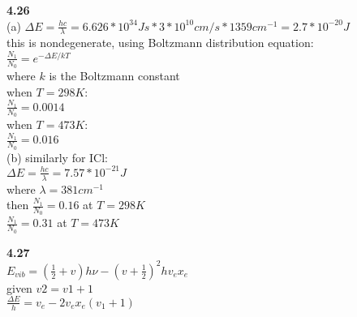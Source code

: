 \documentclass{article}
\begin{document}
\textbf{4.26}\\
(a) $\Delta E = \frac{hc}{\lambda} = 6.626*10^{34}Js*3*10^{10}cm/s*1359cm^{-1} = 2.7*10^{-20}J$\\
this is nondegenerate, using Boltzmann distribution equation:\\
$\frac{N_1}{N_0} = e^{-\Delta E / kT}$\\
where $k$ is the Boltzmann constant\\
when $T = 298K$:\\
$\frac{N_1}{N_0} = 0.0014$\\
when $T = 473K$:\\
$\frac{N_1}{N_0} = 0.016$\\
(b) similarly for ICl:\\
$\Delta E = \frac{hc}{\lambda} = 7.57*10^{-21}J$\\
where $\lambda = 381cm^{-1}$\\
then $\frac{N_1}{N_0} = 0.16$ at $T = 298K$\\
$\frac{N_1}{N_0} = 0.31$ at $T = 473K$\\
\newline

\textbf{4.27}\\
$E_{vib} = (\frac{1}{2}+v)h\nu  - (v+\frac{1}{2})^2hv_ex_e$\\
given $v2 = v1+1$\\
$\frac{\Delta E}{h} = v_e - 2v_ex_e(v_1 + 1)$\\
\newline
\end{document}
